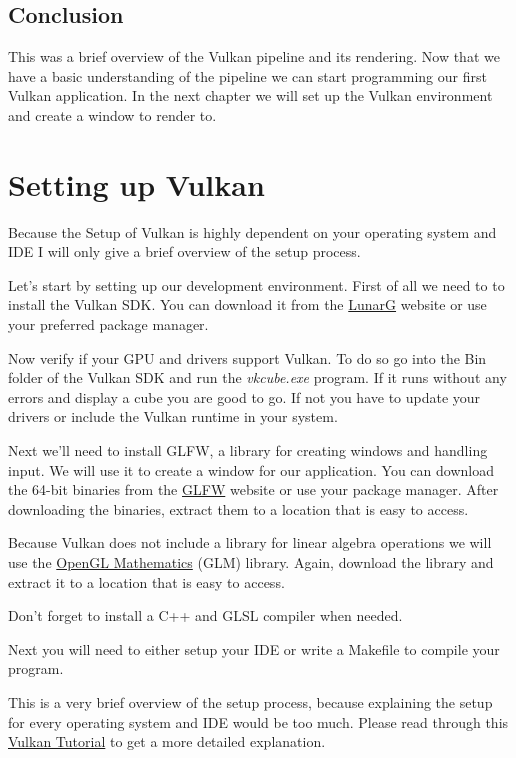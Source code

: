 \documentclass[12pt]{report} \usepackage{preamble}
\begin{document}
\section{Conclusion}

This was a brief overview of the Vulkan pipeline and its rendering.
Now that we have a basic understanding of the pipeline we can start
programming our first Vulkan application. In the next chapter we will set up
the Vulkan environment and create a window to render to.

\chapter{Setting up Vulkan}

Because the Setup of Vulkan is highly dependent on your operating system and IDE
I will only give a brief overview of the setup process.

Let's start by setting up our development environment.
First of all we need to to install the Vulkan SDK. You can download it from the
\href{https://vulkan.lunarg.com/sdk/home}{LunarG} website or use your preferred package manager.

Now verify if your GPU and drivers support Vulkan.
To do so go into the Bin folder of the Vulkan SDK and run the
\textit{vkcube.exe} program. If it runs without any errors and display a cube you are good to go.
If not you have to update your drivers or include the Vulkan runtime in your system.

Next we'll need to install GLFW, a library for creating windows and handling input.
We will use it to create a window for our application.
You can download the 64-bit binaries from the \href{https://www.glfw.org/download.html}{GLFW} website or
use your package manager. After downloading the binaries,
extract them to a location that is easy to access.

Because Vulkan does not include a library for
linear algebra operations we will use the \href{https://github.com/g-truc/glm}{OpenGL Mathematics}
(GLM) library. Again, download the library and extract it to a location that is easy to access.

Don't forget to install a C++ and GLSL compiler when needed.

Next you will need to either setup your IDE or write a Makefile to compile your program.

This is a very brief overview of the setup process,
because explaining the setup for every operating system and IDE would be too much.
Please read through this \href{https://vulkan-tutorial.com/Development_environment}{Vulkan Tutorial}
to get a more detailed explanation.
\end{document}
